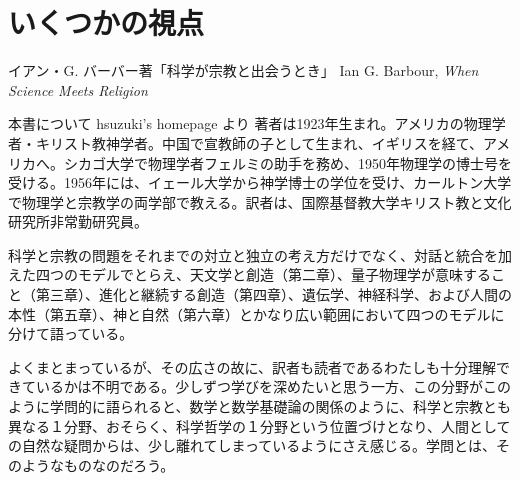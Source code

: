 \documentclass[10pt, dvipdfmx]{beamer}
\begin{document}
\section{いくつかの視点}
\begin{frame}{イアン・G. バーバー著「科学が宗教と出会うとき」}%
{Ian G. Barbour, {\it When Science Meets Religion}}

\begin{block}{本書について \hfill hsuzuki's homepage より}
著者は1923年生まれ。アメリカの物理学者・キリスト教神学者。中国で宣教師の子として生まれ、イギリスを経て、アメリカへ。シカゴ大学で物理学者フェルミの助手を務め、1950年物理学の博士号を受ける。1956年には、イェール大学から神学博士の学位を受け、カールトン大学で物理学と宗教学の両学部で教える。訳者は、国際基督教大学キリスト教と文化研究所非常勤研究員。

科学と宗教の問題をそれまでの対立と独立の考え方だけでなく、対話と統合を加えた四つのモデルでとらえ、天文学と創造（第二章）、量子物理学が意味すること（第三章）、進化と継続する創造（第四章）、遺伝学、神経科学、および人間の本性（第五章）、神と自然（第六章）とかなり広い範囲において四つのモデルに分けて語っている。

よくまとまっているが、その広さの故に、訳者も読者であるわたしも十分理解できているかは不明である。少しずつ学びを深めたいと思う一方、この分野がこのように学問的に語られると、数学と数学基礎論の関係のように、科学と宗教とも異なる１分野、おそらく、科学哲学の１分野という位置づけとなり、人間としての自然な疑問からは、少し離れてしまっているようにさえ感じる。学問とは、そのようなものなのだろう。
\end{block}

\end{frame}
\end{document}
